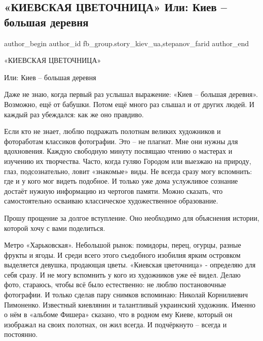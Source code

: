 
 
 
 
 
 
 

\subsection{«КИЕВСКАЯ ЦВЕТОЧНИЦА» Или: Киев – большая деревня}

\label{sec:15_09_2021.fb.fb_group.story_kiev_ua.1.kiev_derevnja_cvetochnica}

 


\ifcmt
 author_begin
   author_id fb_group.story_kiev_ua,stepanov_farid
 author_end
\fi


«КИЕВСКАЯ ЦВЕТОЧНИЦА»

Или: Киев – большая деревня

Даже не знаю, когда первый раз услышал выражение: «Киев – большая деревня».
Возможно, ещё от бабушки. Потом ещё много раз слышал и от других людей. И
каждый раз убеждался: как же оно правдиво.

Если кто не знает, люблю подражать полотнам великих художников и фотоработам
классиков фотографии. Это – не плагиат. Мне они нужны для вдохновения. Каждую
свободную минуту посвящаю чтению о мастерах и изучению их творчества. Часто,
когда гуляю Городом или выезжаю на природу, глаз, подсознательно, ловит
«знакомые» виды. Не всегда сразу могу вспомнить: где и у кого мог видеть
подобное. И только уже дома услужливое сознание достаёт нужную информацию из
чертогов памяти. Можно сказать, что самостоятельно осваиваю классическое
художественное образование.

Прошу прощение за долгое вступление. Оно необходимо для объяснения истории,
которой хочу с вами поделиться.

Метро «Харьковская». Небольшой рынок: помидоры, перец, огурцы, разные фрукты и
ягоды. И среди всего этого съедобного изобилия ярким островком выделяется
девушка, продающая цветы. «Киевская цветочница» - определяю для себя сразу. И
не могу вспомнить у кого из художников уже её видел. Делаю фото, стараюсь,
чтобы всё было естественно: не люблю постановочные фотографии. И только сделав
пару снимков вспоминаю: Николай Корнилиевич Пимоненко. Известный киевлянин и
талантливый украинский художник. Именно о нём в «альбоме Фишера» сказано, что в
родном ему Киеве, который он изображал на своих полотнах, он жил всегда. И
подчёркнуто – всегда и постоянно.

